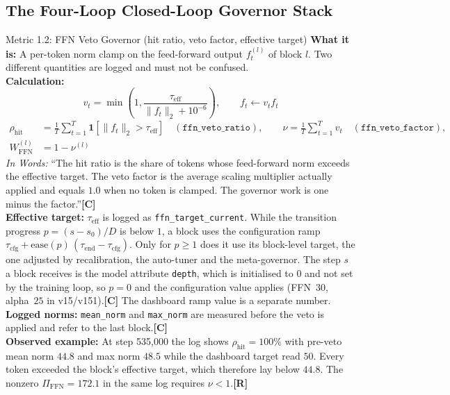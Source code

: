 \documentclass[11pt,a4paper]{article}
\newcommand{\sR}{\textbf{[R]}}
\newcommand{\sC}{\textbf{[C]}}
\begin{document}
\subsection{The Four-Loop Closed-Loop Governor Stack}
\begin{metricbox}{Metric 1.2: FFN Veto Governor (hit ratio, veto factor, effective target)}
\textbf{What it is:} A per-token norm clamp on the feed-forward output $f_t^{(l)}$ of block $l$. Two different quantities are logged and must not be confused.\\
\textbf{Calculation:}
$$v_t = \min\!\left(1, \frac{\tau_{\text{eff}}}{\|f_t\|_2 + 10^{-6}}\right), \qquad f_t \leftarrow v_t f_t$$
$$\begin{aligned}
\rho_{\text{hit}} &= \frac{1}{T}\sum_{t=1}^{T} \mathbf{1}\!\left[\|f_t\|_2 > \tau_{\text{eff}}\right] \quad (\texttt{ffn\_veto\_ratio}), \qquad \nu = \frac{1}{T}\sum_{t=1}^{T} v_t \quad (\texttt{ffn\_veto\_factor}),\\
W_{\text{FFN}}^{(l)} &= 1 - \nu^{(l)}
\end{aligned}$$
\emph{In Words:} ``The hit ratio is the share of tokens whose feed-forward norm exceeds the effective target. The veto factor is the average scaling multiplier actually applied and equals $1.0$ when no token is clamped. The governor work is one minus the factor.''\sC{}\\
\textbf{Effective target:} $\tau_{\text{eff}}$ is logged as \texttt{ffn\_target\_current}. While the transition progress $p = (s - s_0)/D$ is below $1$, a block uses the configuration ramp $\tau_{\text{cfg}} + \text{ease}(p)\,(\tau_{\text{end}} - \tau_{\text{cfg}})$. Only for $p \ge 1$ does it use its block-level target, the one adjusted by recalibration, the auto-tuner and the meta-governor. The step $s$ a block receives is the model attribute \texttt{depth}, which is initialised to $0$ and not set by the training loop, so $p = 0$ and the configuration value applies (FFN~$30$, alpha~$25$ in v15/v151).\sC{} The dashboard ramp value is a separate number.\\
\textbf{Logged norms:} \texttt{mean\_norm} and \texttt{max\_norm} are measured before the veto is applied and refer to the last block.\sC{}\\
\textbf{Observed example:} At step 535{,}000 the log shows $\rho_{\text{hit}} = 100\%$ with pre-veto mean norm $44.8$ and max norm $48.5$ while the dashboard target read $50$. Every token exceeded the block's effective target, which therefore lay below $44.8$. The nonzero $\Pi_{\text{FFN}} = 172.1$ in the same log requires $\nu < 1$.\sR{}\\

\end{metricbox}
\end{document}

